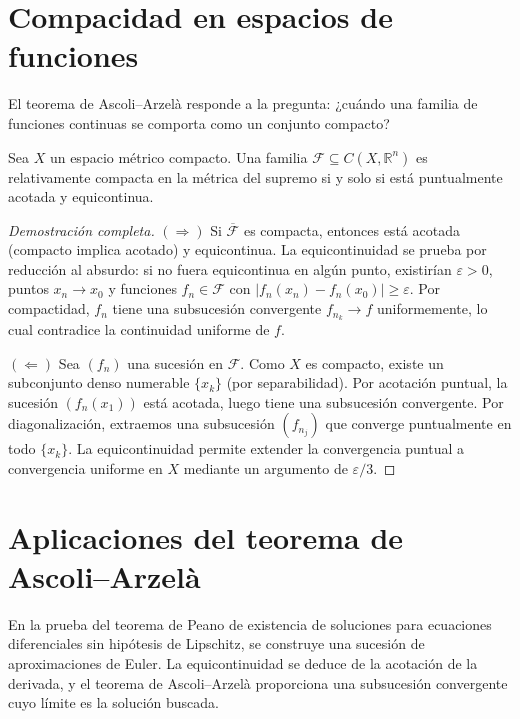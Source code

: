 \section{Compacidad en espacios de funciones}

El teorema de Ascoli--Arzelà responde a la pregunta: ¿cuándo una familia de funciones continuas se comporta como un conjunto compacto?

\begin{theorem}
\label{teo:ascoli-arzela}
Sea $X$ un espacio métrico compacto. Una familia $\mathcal{F}\subseteq C(X,\mathbb{R}^n)$ es relativamente compacta en la métrica del supremo si y solo si está puntualmente acotada y equicontinua.
\end{theorem}
\begin{proof}[Demostración completa]
$(\Rightarrow)$ Si $\overline{\mathcal{F}}$ es compacta, entonces está acotada (compacto implica acotado) y equicontinua. La equicontinuidad se prueba por reducción al absurdo: si no fuera equicontinua en algún punto, existirían $\varepsilon>0$, puntos $x_n\to x_0$ y funciones $f_n\in\mathcal{F}$ con $|f_n(x_n)-f_n(x_0)|\geq\varepsilon$. Por compactidad, $f_n$ tiene una subsucesión convergente $f_{n_k}\to f$ uniformemente, lo cual contradice la continuidad uniforme de $f$.

$(\Leftarrow)$ Sea $(f_n)$ una sucesión en $\mathcal{F}$. Como $X$ es compacto, existe un subconjunto denso numerable $\{x_k\}$ (por separabilidad). Por acotación puntual, la sucesión $(f_n(x_1))$ está acotada, luego tiene una subsucesión convergente. Por diagonalización, extraemos una subsucesión $(f_{n_j})$ que converge puntualmente en todo $\{x_k\}$. La equicontinuidad permite extender la convergencia puntual a convergencia uniforme en $X$ mediante un argumento de $\varepsilon/3$.
\end{proof}

\section{Aplicaciones del teorema de Ascoli--Arzelà}

\begin{example}
\label{ej:edo-ascoli}
En la prueba del teorema de Peano de existencia de soluciones para ecuaciones diferenciales sin hipótesis de Lipschitz, se construye una sucesión de aproximaciones de Euler. La equicontinuidad se deduce de la acotación de la derivada, y el teorema de Ascoli--Arzelà proporciona una subsucesión convergente cuyo límite es la solución buscada.
\end{example}

